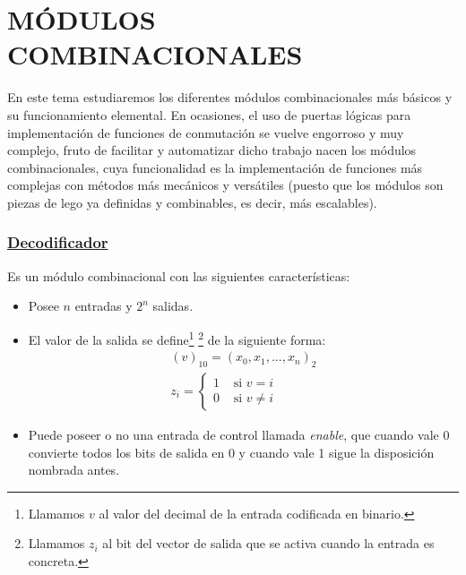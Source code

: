 \documentclass[a4paper,10pt]{book}
\begin{document}
\chapter*{MÓDULOS COMBINACIONALES}
En este tema estudiaremos los diferentes módulos combinacionales más básicos y su funcionamiento elemental. En ocasiones, el uso de puertas lógicas para implementación de funciones de conmutación se vuelve engorroso y muy complejo, fruto de facilitar y automatizar dicho trabajo nacen los módulos combinacionales, cuya funcionalidad es la implementación de funciones más complejas con métodos más mecánicos y versátiles (puesto que los módulos son piezas de lego ya definidas y combinables, es decir, más escalables).

\subsection*{\underline{Decodificador}}
Es un módulo combinacional con las siguientes características:
\begin{itemize}
\item Posee $n$ entradas y $2^n$ salidas.
\item El valor de la salida se define\footnote{Llamamos $v$ al valor del decimal de la entrada codificada en binario.} \footnote{Llamamos $z_i$ al bit del vector de salida que se activa cuando la entrada es concreta.} de la siguiente forma:
\begin{gather}
(v)_{10}=(x_0,x_1,..., x_n)_2 \\
z_i=\begin{cases} 1 &\mbox{ si }v=i \\ 0 &\mbox{ si }v\neq i \end{cases}
\end{gather}
\item Puede poseer o no una entrada de control llamada \textit{enable}, que cuando vale 0 convierte todos los bits de salida en 0 y cuando vale 1 sigue la disposición nombrada antes.
\end{itemize}
\end{document}
